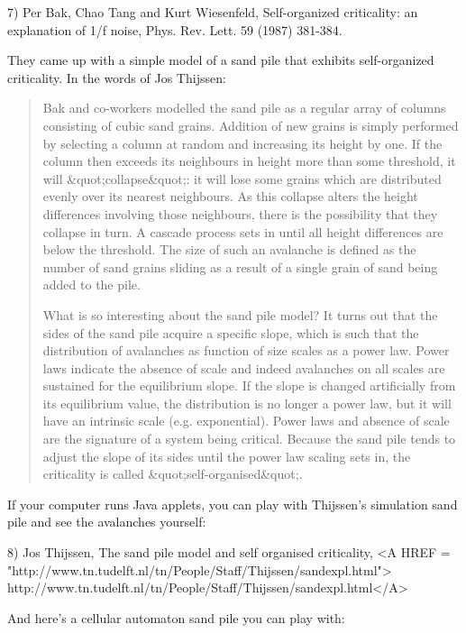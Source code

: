 7) Per Bak, Chao Tang and Kurt Wiesenfeld, Self-organized criticality: 
an explanation of 1/f noise, Phys. Rev. Lett. 59 (1987) 381-384.  

They came up with a simple model of a sand pile that exhibits 
self-organized criticality.  In the words of Jos Thijssen:

\begin{quote}
     Bak and co-workers modelled the sand pile as a regular array 
     of columns consisting of cubic sand grains.  Addition of new 
     grains is simply performed by selecting a column at random and 
     increasing its height by one.  If the column then exceeds its 
     neighbours in height more than some threshold, it 
     will &quot;collapse&quot;: 
     it will lose some grains which are distributed evenly over its 
     nearest neighbours.  As this collapse alters the height differences 
     involving those neighbours, there is the possibility that they 
     collapse in turn.  A cascade process sets in until all height 
     differences are below the threshold. The size of such an avalanche 
     is defined as the number of sand grains sliding as a result of 
     a single grain of sand being added to the pile.

     What is so interesting about the sand pile model?  It turns out 
     that the sides of the sand pile acquire a specific slope, which is 
     such that the distribution of avalanches as function of size scales 
     as a power law. Power laws indicate the absence of scale and indeed 
     avalanches on all scales are sustained for the equilibrium slope. 
     If the slope is changed artificially from its equilibrium value, 
     the distribution is no longer a power law, but it will have an 
     intrinsic scale (e.g. exponential).  Power laws and absence of scale 
     are the signature of a system being critical.  Because the sand pile 
     tends to adjust the slope of its sides until the power law scaling 
     sets in, the criticality is called &quot;self-organised&quot;.
\end{quote}
    

If your computer runs Java applets, you can play with Thijssen's
simulation sand pile and see the avalanches yourself:

8) Jos Thijssen, The sand pile model and self organised criticality,
<A HREF = "http://www.tn.tudelft.nl/tn/People/Staff/Thijssen/sandexpl.html">
http://www.tn.tudelft.nl/tn/People/Staff/Thijssen/sandexpl.html</A>

And here's a cellular automaton sand pile you can play with:   

